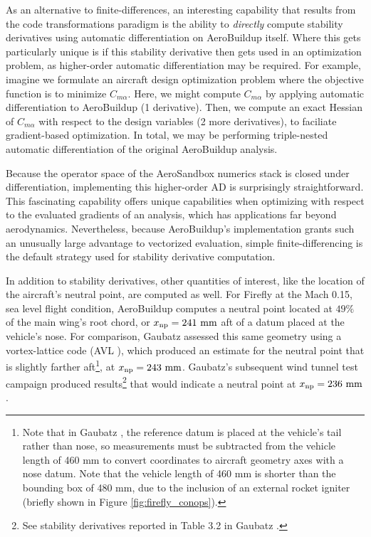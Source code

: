 As an alternative to finite-differences, an interesting capability that results from the code transformations paradigm is the ability to \emph{directly} compute stability derivatives using automatic differentiation on AeroBuildup itself. Where this gets particularly unique is if this stability derivative then gets used in an optimization problem, as higher-order automatic differentiation may be required. For example, imagine we formulate an aircraft design optimization problem where the objective function is to minimize $C_{m\alpha}$. Here, we might compute $C_{m\alpha}$ by applying automatic differentiation to AeroBuildup (1 derivative). Then, we compute an exact Hessian of $C_{m\alpha}$ with respect to the design variables (2 more derivatives), to faciliate gradient-based optimization. In total, we may be performing triple-nested automatic differentiation of the original AeroBuildup analysis.

Because the operator space of the AeroSandbox numerics stack is closed under differentiation, implementing this higher-order AD is surprisingly straightforward. This fascinating capability offers unique capabilities when optimizing with respect to the evaluated gradients of an analysis, which has applications far beyond aerodynamics. Nevertheless, because AeroBuildup's implementation grants such an unusually large advantage to vectorized evaluation, simple finite-differencing is the default strategy used for stability derivative computation.

In addition to stability derivatives, other quantities of interest, like the location of the aircraft's neutral point, are computed as well. For Firefly at the Mach 0.15, sea level flight condition, AeroBuildup computes a neutral point located at $49\%$ of the main wing's root chord, or $x_{\rm np} = 241\ \rm mm$ aft of a datum placed at the vehicle's nose. For comparison, Gaubatz \cite{gaubatz_design_2024} assessed this same geometry using a vortex-lattice code (AVL \cite{avl}), which produced an estimate for the neutral point that is slightly farther aft\footnote{Note that in Gaubatz \cite{gaubatz_design_2024}, the reference datum is placed at the vehicle's tail rather than nose, so measurements must be subtracted from the vehicle length of 460 mm to convert coordinates to aircraft geometry axes with a nose datum. Note that the vehicle length of 460 mm is shorter than the bounding box of 480 mm, due to the inclusion of an external rocket igniter (briefly shown in Figure \ref{fig:firefly_conops}).}, at $x_{\rm np} = 243\ \rm mm$. Gaubatz's subsequent wind tunnel test campaign produced results\footnote{See stability derivatives reported in Table 3.2 in Gaubatz \cite{gaubatz_design_2024}.} that would indicate a neutral point at $x_{\rm np} = 236\ \rm mm$.

